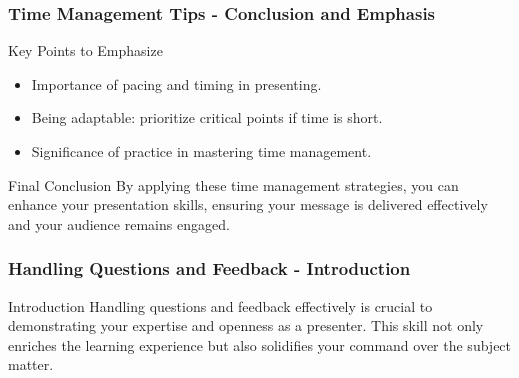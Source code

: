 \documentclass[aspectratio=169]{beamer}
\begin{document}
\begin{frame}[fragile]
    \frametitle{Time Management Tips - Conclusion and Emphasis}
    \begin{block}{Key Points to Emphasize}
        \begin{itemize}
            \item Importance of pacing and timing in presenting.
            \item Being adaptable: prioritize critical points if time is short.
            \item Significance of practice in mastering time management.
        \end{itemize}
    \end{block}
    \begin{block}{Final Conclusion}
        By applying these time management strategies, you can enhance your presentation skills, ensuring your message is delivered effectively and your audience remains engaged.
    \end{block}
\end{frame}

\begin{frame}[fragile]
    \frametitle{Handling Questions and Feedback - Introduction}
    \begin{block}{Introduction}
        Handling questions and feedback effectively is crucial to demonstrating your expertise and openness as a presenter. 
        This skill not only enriches the learning experience but also solidifies your command over the subject matter.
    \end{block}
\end{frame}
\end{document}
